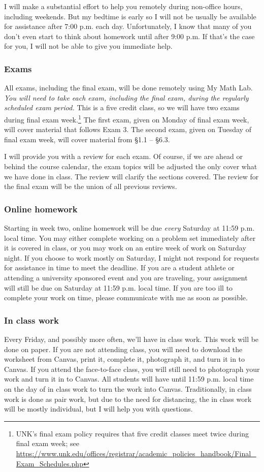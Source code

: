 \documentclass[12pt]{article}
\newcounter{ex}\setcounter{ex}{0}
\newcounter{cy}\setcounter{cy}{\the\year}
\begin{document}
I will make a substantial effort to help you remotely during non-office hours, including weekends.  But my bedtime is early so I will not be usually be available for assistance after 7:00 p.m. each day.
Unfortunately, I know that many of you don't even start to think about homework until after 9:00 p.m. If that's the case for you, I will not be able to give you immediate help.


\subsubsection*{Exams} All exams, including the final exam, will be done remotely using My Math Lab. \emph{You will need to take each exam, including the final exam,  during the regularly scheduled exam period.} This is a five credit class, so we will have two exams during final exam week.\footnote{UNK's final exam policy requires that five credit classes meet twice during final exam week; see
\url{https://www.unk.edu/offices/registrar/academic_policies_handbook/Final_Exam_Schedules.php}}  The first exam, given on Monday of final exam week, will cover material that follows Exam 3.  The second exam, given on Tuesday of final exam week, will cover material from \S1.1 -- \S6.3.

I will provide you with a review for each exam.  Of course, if we are ahead or behind the course calendar,  the exam topics will be adjusted the only cover what we have done in class. The review will clarify the sections covered. The review for the final exam will be the union of all previous reviews.

\subsubsection*{Online homework} Starting in week two, online homework will be due \emph{every} Saturday at 11:59 p.m. local time.  You may either complete working on a problem set immediately after it is covered in class, or you may work on an entire week of work on Saturday night. If you choose to work mostly on Saturday, I might not respond for requests for assistance in time to meet the deadline. If you are a student athlete or attending a university sponsored event and you are traveling, your assignment will still be due on  Saturday at 11:59 p.m. local time.  If you are too ill to complete your work on time, please communicate with me as soon as possible.


\subsubsection*{In class work} Every Friday, and possibly more often, we'll have in class work. This work will be done on paper. If you are not attending class, you will need to download the worksheet from Canvas, print it, complete it, photograph it, and turn it in to Canvas. If you attend the face-to-face class, you will still need to photograph your work and turn it in to Canvas. All students will have until 11:59 p.m. local time on the day of in class work to turn the work into Canvas. Traditionally, in class work is done as pair work, but due to the need for distancing, the in class work will be mostly individual, but I will help you with questions.
\end{document}

